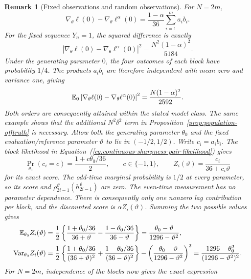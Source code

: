 \documentclass[11pt]{article}
\newtheorem{remark}{Remark}%
\theoremstyle{thmstylethree}%
\begin{document}
\begin{remark}[Fixed observations and random observations]
{For $N=2m$,
\begin{equation}
\nabla_\theta\ell(0)-\nabla_\theta\ell^\alpha(0)
=\frac{1-\alpha}{36}\sum_{i=1}^m a_i b_i.
\label{eq:continuous-sharpness-bias}
\end{equation}
For the fixed sequence $Y_n=1$, the squared difference is exactly
\begin{equation}
\left|\nabla_\theta\ell(0)-\nabla_\theta\ell^\alpha(0)\right|^2
=\frac{N^2(1-\alpha)^2}{5184}.
\label{eq:continuous-fixed-data-sharpness}
\end{equation}
Under the generating parameter $0$, the four outcomes of each block
have probability $1/4$. The products $a_i b_i$ are therefore independent
with mean zero and variance one, giving
\begin{equation}
\mathbb{E}_0\left|\nabla_\theta\ell(0)-\nabla_\theta\ell^\alpha(0)\right|^2
=\frac{N(1-\alpha)^2}{2592}.
\label{eq:continuous-averaged-data-sharpness}
\end{equation}
Both orders are consequently attained within the stated model class.
\endgraf
The same example shows that the additional $N^2\delta^2$ term in
Proposition~\ref{prop:population-offtruth} is necessary. Allow both the
generating parameter $\theta_0$ and the fixed evaluation/reference
parameter $\vartheta$ to lie in $(-1/2,1/2)$. Write $c_i=a_i b_i$.
The block likelihood in
Equation~(\ref{eq:continuous-sharpness-pair-likelihood}) gives
\[
\Pr_{\theta_0}(c_i=c)=\frac{1+c\theta_0/36}{2},\qquad c\in\{-1,1\},
\qquad
Z_i(\vartheta)=\frac{c_i}{36+c_i\vartheta}
\]
for its exact score. The odd-time marginal probability is $1/2$ at every
parameter, so its score and $\rho_{2i-1}^\vartheta(h_{2i-1}^\vartheta)$
are zero. The even-time measurement has no parameter dependence.
There is consequently only one nonzero lag contribution per block, and
the discounted score is $\alpha Z_i(\vartheta)$. Summing the two possible
values gives
\begin{align}
\mathbb{E}_{\theta_0}Z_i(\vartheta)
&=\frac12\left\{\frac{1+\theta_0/36}{36+\vartheta}
 -\frac{1-\theta_0/36}{36-\vartheta}\right\}
=\frac{\theta_0-\vartheta}{1296-\vartheta^2},\notag\\
\mathrm{Var}_{\theta_0}Z_i(\vartheta)
&=\frac12\left\{\frac{1+\theta_0/36}{(36+\vartheta)^2}
 +\frac{1-\theta_0/36}{(36-\vartheta)^2}\right\}
 -\left(\frac{\theta_0-\vartheta}{1296-\vartheta^2}\right)^2
=\frac{1296-\theta_0^2}{(1296-\vartheta^2)^2}.
\end{align}
For $N=2m$, independence of the blocks now gives the exact expression
\begin{align}

\end{align}}
\end{remark}
\end{document}
